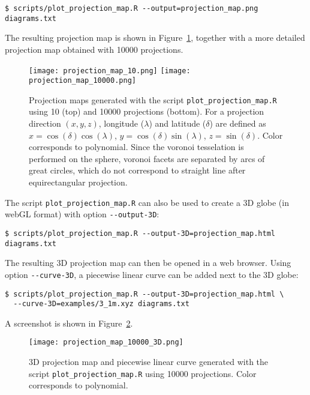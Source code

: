 \begin{lstlisting}
$ scripts/plot_projection_map.R --output=projection_map.png diagrams.txt
\end{lstlisting}
The resulting projection map is shown in Figure~\ref{fig:projectionmap}, together with a more detailed projection map obtained with 10000 projections.
\begin{figure}[t]
\centering
\texttt{[image: projection\_map\_10.png]}
\texttt{[image: projection\_map\_10000.png]}
\caption{Projection maps generated with the script \lstinline{plot_projection_map.R} using 10 (top) and 10000 projections (bottom). For a projection direction $(x,y,z)$, longitude ($\lambda$) and latitude ($\delta$) are defined as $x=\cos(\delta)\cos(\lambda)$, $y=\cos(\delta)\sin(\lambda)$, $z=\sin(\delta)$. Color corresponds to polynomial. Since the voronoi tesselation is performed on the sphere, voronoi facets are separated by arcs of great circles, which do not correspond to straight line after equirectangular projection.}\label{fig:projectionmap}
\end{figure}
The script \lstinline{plot_projection_map.R} can also be used to create a 3D globe (in webGL format\cite{webgl}) with option \lstinline{--output-3D}:
\begin{lstlisting}
$ scripts/plot_projection_map.R --output-3D=projection_map.html diagrams.txt
\end{lstlisting}
The resulting 3D projection map can then be opened in a web browser.
Using option \lstinline{--curve-3D}, a piecewise linear curve can be added next to the 3D globe:
\begin{lstlisting}
$ scripts/plot_projection_map.R --output-3D=projection_map.html \
  --curve-3D=examples/3_1m.xyz diagrams.txt
\end{lstlisting}
A screenshot is shown in Figure~\ref{fig:projectionmap:3D}.
\begin{figure}[t]
\centering
\texttt{[image: projection\_map\_10000\_3D.png]}
\caption{3D projection map and piecewise linear curve generated  with the script \lstinline{plot_projection_map.R} using 10000 projections. Color corresponds to polynomial.}\label{fig:projectionmap:3D}
\end{figure}


